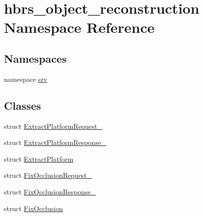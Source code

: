 \hypertarget{namespacehbrs__object__reconstruction}{\section{hbrs\-\_\-object\-\_\-reconstruction \-Namespace \-Reference}
\label{namespacehbrs__object__reconstruction}
}
\subsection*{\-Namespaces}
\begin{DoxyCompactItemize}
\item 
namespace \hyperlink{namespacehbrs__object__reconstruction_1_1srv}{srv}
\end{DoxyCompactItemize}
\subsection*{\-Classes}
\begin{DoxyCompactItemize}
\item 
struct \hyperlink{structhbrs__object__reconstruction_1_1_extract_platform_request__}{\-Extract\-Platform\-Request\-\_\-}
\item 
struct \hyperlink{structhbrs__object__reconstruction_1_1_extract_platform_response__}{\-Extract\-Platform\-Response\-\_\-}
\item 
struct \hyperlink{structhbrs__object__reconstruction_1_1_extract_platform}{\-Extract\-Platform}
\item 
struct \hyperlink{structhbrs__object__reconstruction_1_1_fix_occlusion_request__}{\-Fix\-Occlusion\-Request\-\_\-}
\item 
struct \hyperlink{structhbrs__object__reconstruction_1_1_fix_occlusion_response__}{\-Fix\-Occlusion\-Response\-\_\-}
\item 
struct \hyperlink{structhbrs__object__reconstruction_1_1_fix_occlusion}{\-Fix\-Occlusion}
\end{DoxyCompactItemize}
